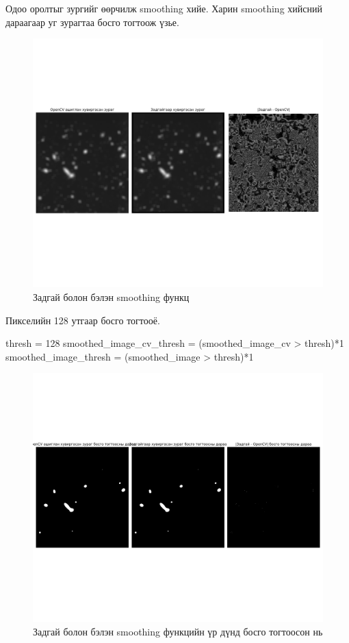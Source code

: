 \documentclass[a4paper]{article}
\begin{document}
Одоо оролтыг зургийг өөрчилж smoothing хийе. Харин smoothing хийсний дараагаар уг зурагтаа босго тогтоож үзье.
\begin{figure}[H]
  \centering
  \includegraphics[scale = 0.30]{smoothing_thresh.png}
  \caption[Intensity 1]{Задгай болон бэлэн smoothing функц}
\end{figure}

Пикселийн 128 утгаар босго тогтооё.
\begin{python}
thresh = 128
smoothed_image_cv_thresh = (smoothed_image_cv > thresh)*1
smoothed_image_thresh = (smoothed_image > thresh)*1
\end{python}
\begin{figure}[H]
  \centering
  \includegraphics[scale = 0.30]{smoothing_thresh_1.png}
  \caption[Intensity 1]{Задгай болон бэлэн smoothing функцийн үр дүнд босго тогтоосон нь}
\end{figure}
\end{document}
